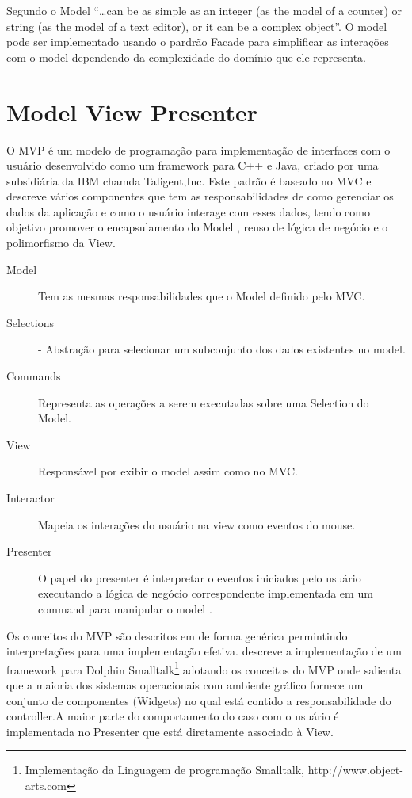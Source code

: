 Segundo  o Model ``\ldots can be as simple as an integer
(as the model of a counter) or string (as the model of a text editor), or it can
be a complex object''. O model pode ser implementado usando o pardrão Facade
para simplificar as interações com o model dependendo da complexidade do
domínio que ele representa.



\section{Model View Presenter}

O MVP é um modelo de programação para implementação de interfaces com o usuário
desenvolvido como um framework para C++ e Java, criado por uma subsidiária da
IBM chamda Taligent,Inc. Este padrão é baseado no MVC e descreve vários componentes que tem as
responsabilidades de como gerenciar os dados da aplicação e como o usuário
interage com esses dados, tendo como objetivo promover o encapsulamento do Model
, reuso de lógica de negócio e o polimorfismo da View.

\begin{description}
  \item[Model] Tem as mesmas responsabilidades que o Model definido pelo MVC.
  \item[Selections] - Abstração para selecionar um subconjunto dos dados
  existentes no model.
  \item [Commands] Representa as operações a serem executadas sobre uma
  Selection do Model.
  \item [View] Responsável por exibir o model assim como no MVC.
  \item [Interactor] Mapeia os interações do usuário na view como eventos do
  mouse.
  \item [Presenter] O papel do presenter é interpretar o eventos iniciados pelo
  usuário executando a lógica de negócio correspondente implementada em um
  command para manipular o model \cite{Potel96mvp}.
\end{description}


Os conceitos do MVP são descritos em  de forma genérica
permintindo interpretações para uma implementação efetiva.
 descreve a implementação de um framework para
Dolphin Smalltalk\footnote{Implementação da Linguagem de programação Smalltalk,
http://www.object-arts.com} adotando os conceitos do MVP onde salienta que a
maioria dos sistemas operacionais com ambiente gráfico fornece um conjunto de
componentes (Widgets) no qual está contido a responsabilidade do controller.A
maior parte do comportamento do caso com o usuário é implementada no
Presenter que está diretamente associado à View.

